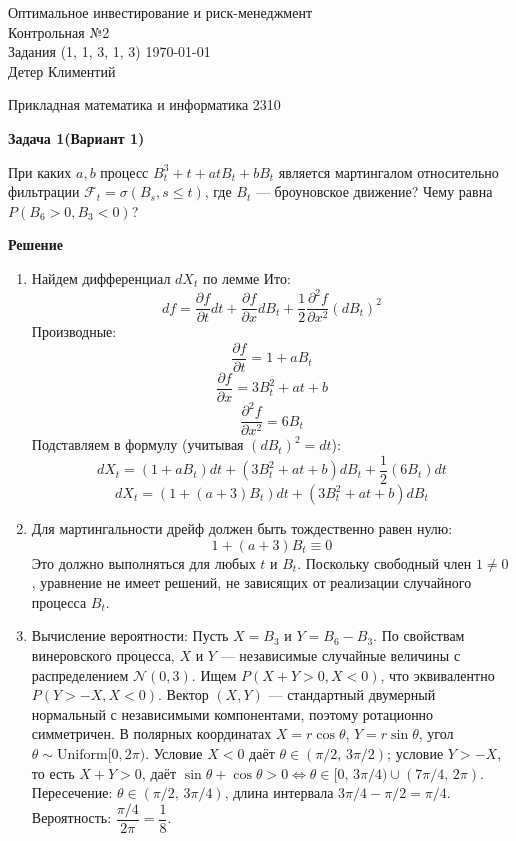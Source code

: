 \documentclass[a4paper,12pt]{extarticle}
\begin{document}
\begingroup  
    \centering
    \LARGE Оптимальное инвестирование и риск-менеджмент\\
    \LARGE  Контрольная №2\\[0.5em]
    \large Задания (1, 1, 3, 1, 3)
    \large \today\\[0.5em]
    \large Детер Климентий\par
    \large Прикладная математика и информатика 2310\par
\endgroup

\begin{center}
    \textbf{Задача 1(Вариант 1)}
\end{center}
При каких $a,b$ процесс $B^3_t +t + atB_t + bB_t$ является мартингалом относительно фильтрации $\mathcal{F}_t = \sigma(B_s, s\leq t)$, где $B_t$ — броуновское движение?
Чему равна $P(B_6 > 0,B_3 <0)$?
\begin{center}
    \textbf{Решение}
\end{center}
\begin{enumerate}
    \item Найдем дифференциал $dX_t$ по лемме Ито:
    $$df = \frac{\partial f}{\partial t}dt + \frac{\partial f}{\partial x}dB_t + \frac{1}{2}\frac{\partial^2 f}{\partial x^2}(dB_t)^2$$
    Производные:
    $$\frac{\partial f}{\partial t} = 1 + aB_t$$
    $$\frac{\partial f}{\partial x} = 3B_t^2 + at + b$$
    $$\frac{\partial^2 f}{\partial x^2} = 6B_t$$
    Подставляем в формулу (учитывая $(dB_t)^2 = dt$):
    $$dX_t = (1 + aB_t)dt + (3B_t^2 + at + b)dB_t + \frac{1}{2}(6B_t)dt$$
    $$dX_t = (1 + (a+3)B_t)dt + (3B_t^2 + at + b)dB_t$$

    \item Для мартингальности дрейф должен быть тождественно равен нулю:
    $$1 + (a+3)B_t \equiv 0$$
    Это должно выполняться для любых $t$ и $B_t$. Поскольку свободный член $1 \neq 0$, уравнение не имеет решений, не зависящих от реализации случайного процесса $B_t$.

    \item Вычисление вероятности:
    Пусть $X = B_3$ и $Y = B_6 - B_3$. По свойствам винеровского процесса, $X$ и $Y$ — независимые случайные величины с распределением $\mathcal{N}(0, 3)$.
    Ищем $P(X + Y > 0, X < 0)$, что эквивалентно $P(Y > -X, X < 0)$.
    Вектор $(X, Y)$ — стандартный двумерный нормальный с независимыми компонентами, поэтому ротационно симметричен.
    В полярных координатах $X = r\cos\theta$, $Y = r\sin\theta$, угол $\theta \sim \mathrm{Uniform}[0, 2\pi)$.
    Условие $X < 0$ даёт $\theta \in (\pi/2,\, 3\pi/2)$; условие $Y > -X$, то есть $X + Y > 0$, даёт
    $\sin\theta + \cos\theta > 0 \iff \theta \in [0,\, 3\pi/4) \cup (7\pi/4,\, 2\pi)$.
    Пересечение: $\theta \in (\pi/2,\, 3\pi/4)$, длина интервала $3\pi/4 - \pi/2 = \pi/4$.
    Вероятность: $\dfrac{\pi/4}{2\pi} = \dfrac{1}{8}$.
\end{enumerate}
\end{document}
